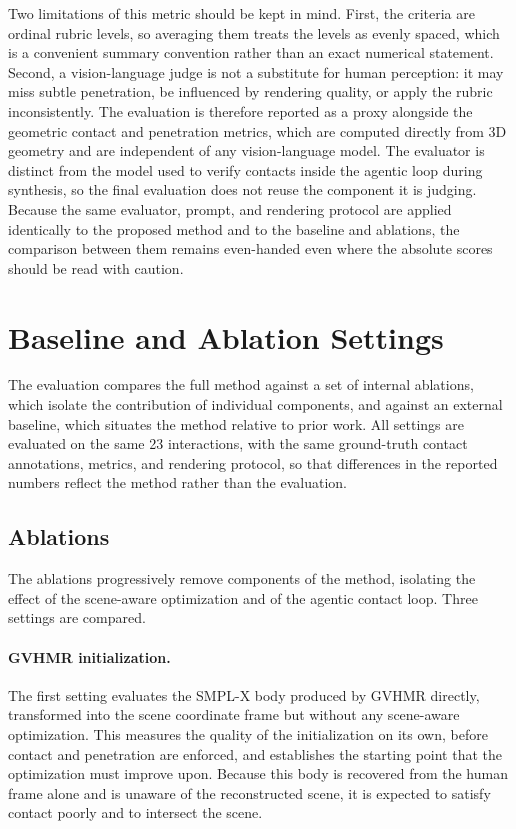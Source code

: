 Two limitations of this metric should be kept in mind. First, the criteria are ordinal rubric levels, so averaging them treats the levels as evenly spaced, which is a convenient summary convention rather than an exact numerical statement. Second, a vision-language judge is not a substitute for human perception: it may miss subtle penetration, be influenced by rendering quality, or apply the rubric inconsistently. The evaluation is therefore reported as a proxy alongside the geometric contact and penetration metrics, which are computed directly from 3D geometry and are independent of any vision-language model. The evaluator is distinct from the model used to verify contacts inside the agentic loop during synthesis, so the final evaluation does not reuse the component it is judging. Because the same evaluator, prompt, and rendering protocol are applied identically to the proposed method and to the baseline and ablations, the comparison between them remains even-handed even where the absolute scores should be read with caution.

\section{Baseline and Ablation Settings}
\label{sec:exp-baseline-ablation}

The evaluation compares the full method against a set of internal ablations, which isolate the contribution of individual components, and against an external baseline, which situates the method relative to prior work. All settings are evaluated on the same 23 interactions, with the same ground-truth contact annotations, metrics, and rendering protocol, so that differences in the reported numbers reflect the method rather than the evaluation.

\subsection{Ablations}
\label{sec:exp-ablations}

The ablations progressively remove components of the method, isolating the effect of the scene-aware optimization and of the agentic contact loop. Three settings are compared.

\paragraph{GVHMR initialization.} The first setting evaluates the SMPL-X body produced by GVHMR directly, transformed into the scene coordinate frame but without any scene-aware optimization. This measures the quality of the initialization on its own, before contact and penetration are enforced, and establishes the starting point that the optimization must improve upon. Because this body is recovered from the human frame alone and is unaware of the reconstructed scene, it is expected to satisfy contact poorly and to intersect the scene.

